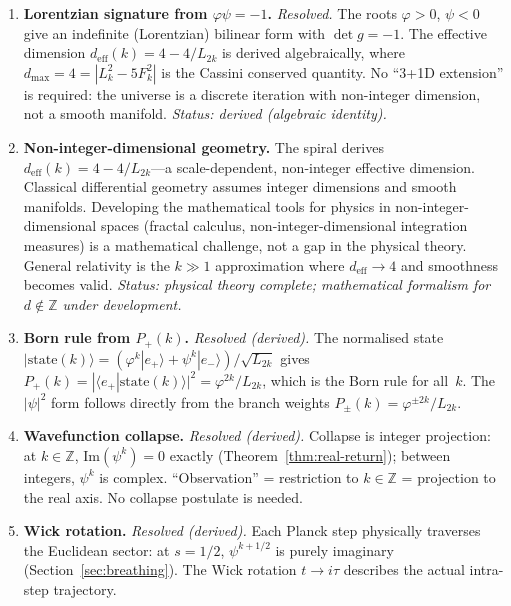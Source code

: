 \documentclass[12pt,a4paper]{article}
\begin{document}
\begin{enumerate}
\item \textbf{Lorentzian signature from $\varphi\psi = -1$.} \emph{Resolved.} The roots $\varphi > 0$, $\psi < 0$ give an indefinite (Lorentzian) bilinear form with $\det g = -1$. The effective dimension $d_{\mathrm{eff}}(k) = 4 - 4/L_{2k}$ is derived algebraically, where $d_{\max} = 4 = |L_k^2 - 5F_k^2|$ is the Cassini conserved quantity. No ``3+1D extension'' is required: the universe is a discrete iteration with non-integer dimension, not a smooth manifold. \emph{Status: derived (algebraic identity).}

\item \textbf{Non-integer-dimensional geometry.} The spiral derives $d_{\mathrm{eff}}(k) = 4 - 4/L_{2k}$---a scale-dependent, non-integer effective dimension. Classical differential geometry assumes integer dimensions and smooth manifolds. Developing the mathematical tools for physics in non-integer-dimensional spaces (fractal calculus, non-integer-dimensional integration measures) is a mathematical challenge, not a gap in the physical theory. General relativity is the $k \gg 1$ approximation where $d_{\mathrm{eff}} \to 4$ and smoothness becomes valid. \emph{Status: physical theory complete; mathematical formalism for $d \notin \mathbb{Z}$ under development.}

\item \textbf{Born rule from $P_+(k)$.} \emph{Resolved (derived).} The normalised state $|\mathrm{state}(k)\rangle = (\varphi^k|e_+\rangle + \psi^k|e_-\rangle)/\sqrt{L_{2k}}$ gives $P_+(k) = |\langle e_+|\mathrm{state}(k)\rangle|^2 = \varphi^{2k}/L_{2k}$, which is the Born rule for all~$k$. The $|\psi|^2$ form follows directly from the branch weights $P_\pm(k) = \varphi^{\pm 2k}/L_{2k}$.

\item \textbf{Wavefunction collapse.} \emph{Resolved (derived).} Collapse is integer projection: at $k \in \mathbb{Z}$, $\mathrm{Im}(\psi^k) = 0$ exactly (Theorem~\ref{thm:real-return}); between integers, $\psi^k$ is complex. ``Observation'' = restriction to $k \in \mathbb{Z}$ = projection to the real axis. No collapse postulate is needed.

\item \textbf{Wick rotation.} \emph{Resolved (derived).} Each Planck step physically traverses the Euclidean sector: at $s = 1/2$, $\psi^{k+1/2}$ is purely imaginary (Section~\ref{sec:breathing}). The Wick rotation $t \to i\tau$ describes the actual intra-step trajectory.


\end{enumerate}
\end{document}
